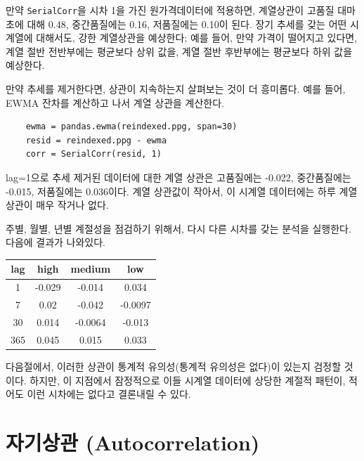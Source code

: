 
만약 {\tt SerialCorr}을 시차 1을 가진 원가격데이터에 적용하면, 계열상관이 고품질 대마초에 대해 0.48, 중간품질에는 0.16, 저품질에는 0.10이 된다.
장기 추세를 갖는 어떤 시계열에 대해서도, 강한 계열상관을 예상한다; 예를 들어, 만약 가격이 떨어지고 있다면, 계열 절반 전반부에는 평균보다 상위 값을, 계열 절반 후반부에는 평균보다 하위 값을 예상한다.

만약 추세를 제거한다면, 상관이 지속하는지 살펴보는 것이 더 흥미롭다.
예를 들어, EWMA 잔차를 계산하고 나서 계열 상관을 계산한다.

\begin{verbatim}
    ewma = pandas.ewma(reindexed.ppg, span=30)
    resid = reindexed.ppg - ewma
    corr = SerialCorr(resid, 1)
\end{verbatim}

lag=1으로 추세 제거된 데이터에 대한 계열 상관은 고품질에는 -0.022,
중간품질에는 -0.015, 저품질에는 0.036이다.
계열 상관값이 작아서, 이 시계열 데이터에는 하루 계열상관이 매우 작거나 없다.

주별, 월별, 년별 계절성을 점검하기 위해서, 다시 다른 시차를 갖는 분석을 실행한다. 다음에 결과가 나와있다. 

\begin{center}
\begin{tabular}{|c|c|c|c|}
\hline
lag & high & medium & low \\ \hline
1 & -0.029 & -0.014 & 0.034 \\
7 & 0.02 & -0.042 & -0.0097 \\
30 & 0.014 & -0.0064 & -0.013 \\
365 & 0.045 & 0.015 & 0.033 \\
\hline
\end{tabular}
\end{center}

다음절에서, 이러한 상관이 통계적 유의성(통계적 유의성은 없다)이 있는지 검정할 것이다. 하지만, 이 지점에서 잠정적으로 이들 시계열 데이터에 상당한 계절적 패턴이, 적어도 이런 시차에는 없다고 결론내릴 수 있다.



\section{자기상관 (Autocorrelation)}

